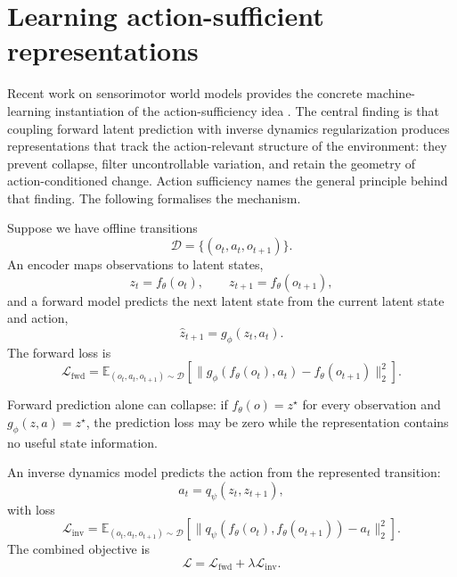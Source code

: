 \documentclass[11pt]{article}
\theoremstyle{remark}
\newcommand{\E}{\mathbb E}
\newcommand{\1}{\mathbb 1}
\begin{document}
\section{Learning action-sufficient representations}

Recent work on sensorimotor world models provides the concrete machine-learning instantiation of the action-sufficiency idea \citep{Ivashkov-smwm26}. The central finding is that coupling forward latent prediction with inverse dynamics regularization produces representations that track the action-relevant structure of the environment: they prevent collapse, filter uncontrollable variation, and retain the geometry of action-conditioned change. Action sufficiency names the general principle behind that finding. The following formalises the mechanism.

Suppose we have offline transitions
\begin{equation}
    \mathcal D=\{(o_t,a_t,o_{t+1})\}.
\end{equation}
An encoder maps observations to latent states,
\begin{equation}
    z_t=f_\theta(o_t),\qquad z_{t+1}=f_\theta(o_{t+1}),
\end{equation}
and a forward model predicts the next latent state from the current latent state and action,
\begin{equation}
    \hat z_{t+1}=g_\phi(z_t,a_t).
\end{equation}
The forward loss is
\begin{equation}
    \mathcal L_{\mathrm{fwd}}
    =
    \E_{(o_t,a_t,o_{t+1})\sim\mathcal D}
    \left[
    \|g_\phi(f_\theta(o_t),a_t)-f_\theta(o_{t+1})\|_2^2
    \right].
    \label{eq:fwd-loss}
\end{equation}

Forward prediction alone can collapse: if $f_\theta(o)=z^\star$ for every observation and $g_\phi(z,a)=z^\star$, the prediction loss may be zero while the representation contains no useful state information.

An inverse dynamics model predicts the action from the represented transition:
\begin{equation}
    \hat a_t=q_\psi(z_t,z_{t+1}),
\end{equation}
with loss
\begin{equation}
    \mathcal L_{\mathrm{inv}}
    =
    \E_{(o_t,a_t,o_{t+1})\sim\mathcal D}
    \left[
    \|q_\psi(f_\theta(o_t),f_\theta(o_{t+1}))-a_t\|_2^2
    \right].
    \label{eq:inv-loss}
\end{equation}
The combined objective is
\begin{equation}
    \mathcal L
    =
    \mathcal L_{\mathrm{fwd}}+
    \lambda \mathcal L_{\mathrm{inv}}.
    \label{eq:combined-loss}
\end{equation}
\end{document}

